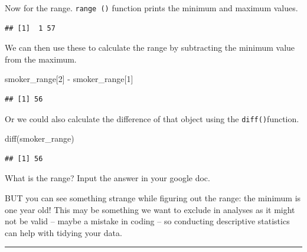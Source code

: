 \documentclass[
]{book}
\newenvironment{Shaded}{\begin{snugshade}}{\end{snugshade}}
\newcommand{\AttributeTok}[1]{\textcolor[rgb]{0.77,0.63,0.00}{#1}}
\newcommand{\ConstantTok}[1]{\textcolor[rgb]{0.00,0.00,0.00}{#1}}
\newcommand{\DecValTok}[1]{\textcolor[rgb]{0.00,0.00,0.81}{#1}}
\newcommand{\FunctionTok}[1]{\textcolor[rgb]{0.00,0.00,0.00}{#1}}
\newcommand{\NormalTok}[1]{#1}
\newcommand{\OtherTok}[1]{\textcolor[rgb]{0.56,0.35,0.01}{#1}}
\newcommand{\SpecialCharTok}[1]{\textcolor[rgb]{0.00,0.00,0.00}{#1}}
\begin{document}
Now for the range. \texttt{range\ ()} function prints the minimum and maximum values.

\begin{Shaded}
\end{Shaded}

\begin{verbatim}
## [1]  1 57
\end{verbatim}

We can then use these to calculate the range by subtracting the minimum value from the maximum.

\begin{Shaded}
\begin{Highlighting}[]
\NormalTok{smoker\_range[}\DecValTok{2}\NormalTok{] }\SpecialCharTok{{-}}\NormalTok{ smoker\_range[}\DecValTok{1}\NormalTok{]}
\end{Highlighting}
\end{Shaded}

\begin{verbatim}
## [1] 56
\end{verbatim}

Or we could also calculate the difference of that object using the \texttt{diff()}function.

\begin{Shaded}
\begin{Highlighting}[]
\FunctionTok{diff}\NormalTok{(smoker\_range)}
\end{Highlighting}
\end{Shaded}

\begin{verbatim}
## [1] 56
\end{verbatim}

What is the range? Input the answer in your google doc.

BUT you can see something strange while figuring out the range: the minimum is one year old! This may be something we want to exclude in analyses as it might not be valid -- maybe a mistake in coding -- so conducting descriptive statistics can help with tidying your data.

\begin{center}\rule{0.5\linewidth}{0.5pt}\end{center}
\end{document}
